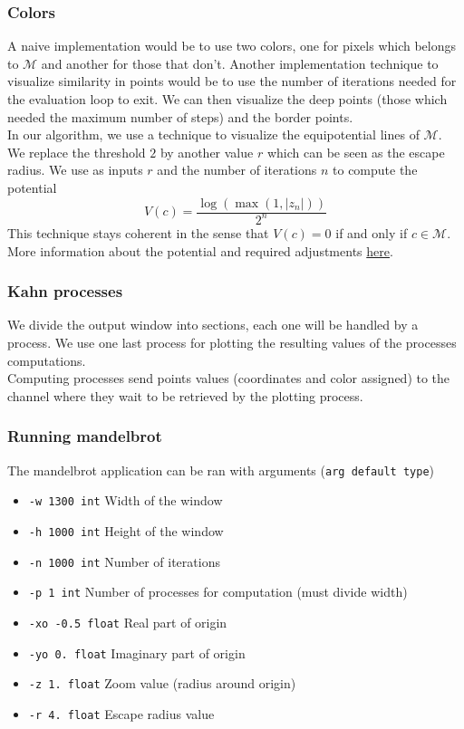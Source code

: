\documentclass[10pt,a4paper]{article}
\begin{document}
\subsubsection{Colors}
A naive implementation would be to use two colors, one for pixels which belongs to $\mathcal{M}$ and another for those that don't. Another implementation technique to visualize similarity in points would be to use the number of iterations needed for the evaluation loop to exit. We can then visualize the deep points (those which needed the maximum number of steps) and the border points.\\
In our algorithm, we use a technique to visualize the equipotential lines of $\mathcal{M}$.\\
We replace the threshold $2$ by another value $r$ which can be seen as the escape radius. We use as inputs $r$ and the number of iterations $n$ to compute the potential $$V(c) = \frac{\log (\max (1, |z_n|))}{2^n}$$
This technique stays coherent in the sense that $V(c) = 0$ if and only if $c \in \mathcal{M}$. More information about the potential and required adjustments \href{https://www.math.univ-toulouse.fr/~cheritat/wiki-draw/index.php/Mandelbrot_set#The_potential}{\color{blue}here}. 


\subsubsection{Kahn processes}
We divide the output window into sections, each one will be handled by a process. We use one last process for plotting the resulting values of the processes computations.\\
Computing processes send points values (coordinates and color assigned) to the channel where they wait to be retrieved by the plotting process.

\subsubsection{Running mandelbrot}
The mandelbrot application can be ran with arguments (\texttt{arg default type})
\begin{itemize}[label={}]
	\item \texttt{-w 1300 int} Width of the window
	\item \texttt{-h 1000 int} Height of the window
	\item \texttt{-n 1000 int} Number of iterations
	\item \texttt{-p 1 int} Number of processes for computation (must divide width)
	\item \texttt{-xo -0.5 float} Real part of origin
	\item \texttt{-yo 0. float} Imaginary part of origin
	\item \texttt{-z 1. float} Zoom value (radius around origin)
	\item \texttt{-r 4. float} Escape radius value 
	
\end{itemize}
\end{document}
